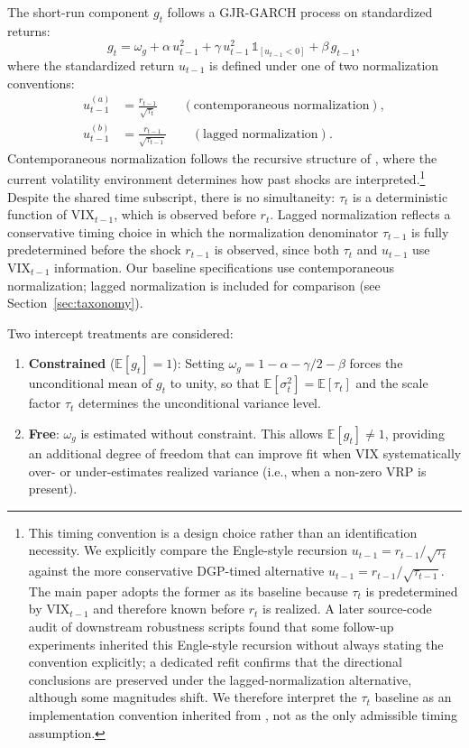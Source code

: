 \documentclass[12pt,a4paper]{article}
\newcommand{\E}{\mathbb{E}}
\begin{document}
The short-run component $g_t$ follows a GJR-GARCH process \citep{glosten1993} on standardized returns:
\begin{equation}
g_t = \omega_g + \alpha \, u_{t-1}^2 + \gamma \, u_{t-1}^2 \, \mathbb{1}_{[u_{t-1}<0]} + \beta \, g_{t-1},
\label{eq:g_gjr}
\end{equation}
where the standardized return $u_{t-1}$ is defined under one of two normalization conventions:
\begin{align}
u_{t-1}^{(a)} &= \frac{r_{t-1}}{\sqrt{\tau_t}} \qquad (\text{contemporaneous normalization}), \label{eq:u_contemp} \\
u_{t-1}^{(b)} &= \frac{r_{t-1}}{\sqrt{\tau_{t-1}}} \qquad (\text{lagged normalization}). \label{eq:u_lagged}
\end{align}
Contemporaneous normalization follows the recursive structure of \citet[Eq.~4]{engle2013}, where the current volatility environment determines how past shocks are interpreted.\footnote{This timing convention is a design choice rather than an identification necessity. We explicitly compare the Engle-style recursion $u_{t-1}=r_{t-1}/\sqrt{\tau_t}$ against the more conservative DGP-timed alternative $u_{t-1}=r_{t-1}/\sqrt{\tau_{t-1}}$. The main paper adopts the former as its baseline because $\tau_t$ is predetermined by $\mathrm{VIX}_{t-1}$ and therefore known before $r_t$ is realized. A later source-code audit of downstream robustness scripts found that some follow-up experiments inherited this Engle-style recursion without always stating the convention explicitly; a dedicated refit confirms that the directional conclusions are preserved under the lagged-normalization alternative, although some magnitudes shift. We therefore interpret the $\tau_t$ baseline as an implementation convention inherited from \citet{engle2013}, not as the only admissible timing assumption.} Despite the shared time subscript, there is no simultaneity: $\tau_t$ is a deterministic function of $\mathrm{VIX}_{t-1}$, which is observed before $r_t$. Lagged normalization reflects a conservative timing choice in which the normalization denominator $\tau_{t-1}$ is fully predetermined before the shock $r_{t-1}$ is observed, since both $\tau_t$ and $u_{t-1}$ use $\mathrm{VIX}_{t-1}$ information. Our baseline specifications use contemporaneous normalization; lagged normalization is included for comparison (see Section~\ref{sec:taxonomy}).

Two intercept treatments are considered:
\begin{enumerate}[label=(\roman*)]
\item \textbf{Constrained} ($\E[g_t] = 1$): Setting $\omega_g = 1 - \alpha - \gamma/2 - \beta$ forces the unconditional mean of $g_t$ to unity, so that $\E[\sigma_t^2] = \E[\tau_t]$ and the scale factor $\tau_t$ determines the unconditional variance level.

\item \textbf{Free}: $\omega_g$ is estimated without constraint. This allows $\E[g_t] \neq 1$, providing an additional degree of freedom that can improve fit when VIX systematically over- or under-estimates realized variance (i.e., when a non-zero VRP is present).
\end{enumerate}
\end{document}
